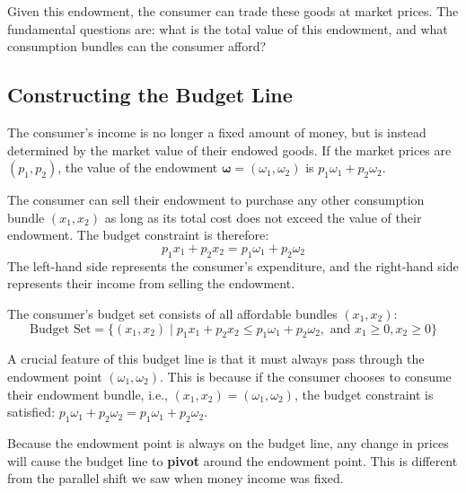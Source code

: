 Given this endowment, the consumer can trade these goods at market prices. The fundamental questions are: what is the total value of this endowment, and what consumption bundles can the consumer afford?

\subsection{Constructing the Budget Line}

The consumer's income is no longer a fixed amount of money, but is instead determined by the market value of their endowed goods. If the market prices are $(p_1, p_2)$, the value of the endowment $\boldsymbol{\omega} = (\omega_1, \omega_2)$ is $p_1\omega_1 + p_2\omega_2$.

The consumer can sell their endowment to purchase any other consumption bundle $(x_1, x_2)$ as long as its total cost does not exceed the value of their endowment. The budget constraint is therefore:
\[
p_1 x_1 + p_2 x_2 = p_1 \omega_1 + p_2 \omega_2
\]
The left-hand side represents the consumer's expenditure, and the right-hand side represents their income from selling the endowment.

The consumer's budget set consists of all affordable bundles $(x_1, x_2)$:
\[
\text{Budget Set} = \{ (x_1, x_2) \mid p_1 x_1 + p_2 x_2 \le p_1 \omega_1 + p_2 \omega_2, \text{ and } x_1 \ge 0, x_2 \ge 0 \}
\]

A crucial feature of this budget line is that it must always pass through the endowment point $(\omega_1, \omega_2)$. This is because if the consumer chooses to consume their endowment bundle, i.e., $(x_1, x_2) = (\omega_1, \omega_2)$, the budget constraint is satisfied: $p_1 \omega_1 + p_2 \omega_2 = p_1 \omega_1 + p_2 \omega_2$.

\begin{remark}
Because the endowment point is always on the budget line, any change in prices will cause the budget line to \textbf{pivot} around the endowment point. This is different from the parallel shift we saw when money income was fixed.
\end{remark}


